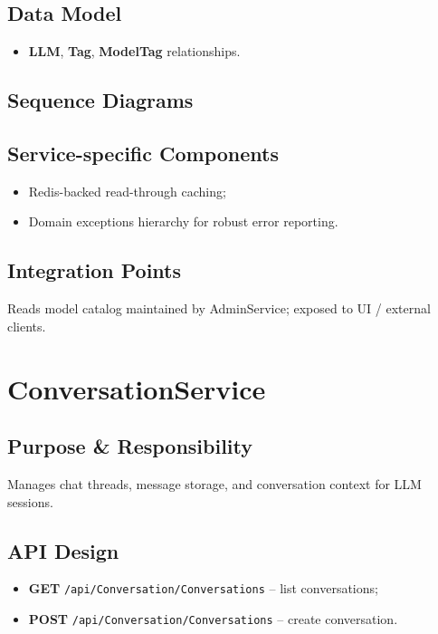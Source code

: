 \subsection{Data Model}
\begin{itemize}
  \item \textbf{LLM}, \textbf{Tag}, \textbf{ModelTag} relationships.
\end{itemize}

\subsection{Sequence Diagrams}

\subsection{Service-specific Components}
\begin{itemize}
  \item Redis-backed read-through caching;
  \item Domain exceptions hierarchy for robust error reporting.
\end{itemize}

\subsection{Integration Points}
Reads model catalog maintained by AdminService; exposed to UI / external clients.

\section{ConversationService}
\subsection{Purpose \& Responsibility}
Manages chat threads, message storage, and conversation context for LLM sessions.

\subsection{API Design}
\begin{itemize}
  \item \textbf{GET} \texttt{/api/Conversation/Conversations} – list conversations;
  \item \textbf{POST} \texttt{/api/Conversation/Conversations} – create conversation.
\end{itemize}

